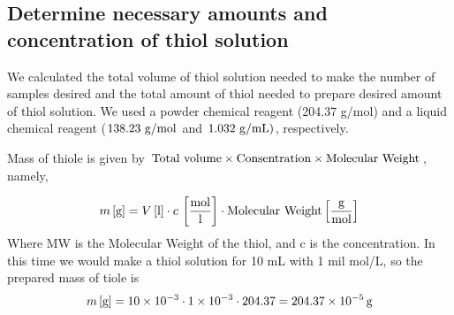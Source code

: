 \subsection{Determine necessary amounts and concentration of thiol solution}

We calculated the total volume of thiol solution needed to make the number of samples desired and the total amount of thiol needed to prepare desired amount of thiol solution. We used a powder chemical reagent (204.37 g/mol) and a liquid chemical reagent ($138.23 \ {\rm g/mol}$ and $1.032 \ {\rm g/mL})$, respectively. 

Mass of thiole is given by 
$ {\rm Total\ volume \times Consentration \times Molecular \ Weight}$, namely,

\begin{equation}
 m\, [{\rm g}]=V \, [{\rm l}] \cdot c \, \left[ \frac{{{\rm mol}}}{\rm l}\right] \cdot 
\text{Molecular Weight} \left[ \frac{\rm g}{{\rm mol}}\right]
\end{equation}
Where MW is the Molecular Weight of the thiol, and c is the concentration.
In this time we would make a thiol solution for 10 mL with 1 mil mol/L, so the prepared mass of tiole is 
\begin{eqnarray}
m\, [{\rm g}]=10\times 10^{-3}\cdot 1\times 10^{-3} 
\cdot  204.37  \nonumber
=204.37 \times 10^{-5} \, {\rm g}
\end{eqnarray}

